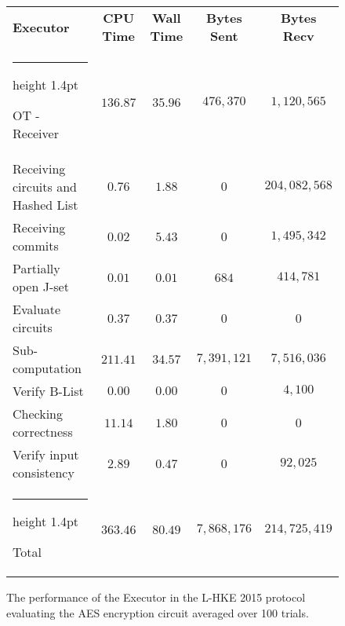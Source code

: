 \documentclass[11pt]{article} %
\makeatletter
\newcommand{\thickhline}{%
    \noalign {\ifnum 0=`}\fi \hrule height 1.4pt
    \futurelet \reserved@a \@xhline
}
\makeatother
\begin{document}
				\begin{figure}[!ht]
					\begin{tabular}{| p{4.3cm} | c c c c |}
						\hline
						\textbf{Executor} & \textbf{CPU Time} & \textbf{Wall Time} & \textbf{Bytes Sent} & \textbf{Bytes Recv} \\
						\thickhline
						OT - Receiver & $136.87$ & $35.96$ & $476,370$ & $1,120,565$ \\
						\hline
						Receiving circuits and Hashed List & $0.76$ & $1.88$ & $0$ & $204,082,568$ \\
						\hline
						Receiving commits & $0.02$ & $5.43$ & $0$ & $1,495,342$ \\
						\hline
						Partially open J-set & $0.01$ & $0.01$ & $684$ & $414,781$ \\
						\hline
						Evaluate circuits & $0.37$ & $0.37$ & $0$ & $0$ \\
						\hline
						Sub-computation & $211.41$ & $34.57$ & $7,391,121$ & $7,516,036$ \\
						\hline
						Verify B-List & $0.00$ & $0.00$ & $0$ & $4,100$ \\
						\hline
						Checking correctness & $11.14$ & $1.80$ & $0$ & $0$ \\
						\hline
						Verify input consistency & $2.89$ & $0.47$ & $0$ & $92,025$ \\
						\thickhline
						Total & $363.46$ & $80.49$ & $7,868,176$ & $214,725,419$ \\
						\hline
					\end{tabular}
					\caption{The performance of the Executor in the L-HKE 2015 protocol evaluating the AES encryption circuit averaged over 100 trials. \label{table:L-HKE_2015_AES_Executor}}
				\end{figure}
\end{document}
